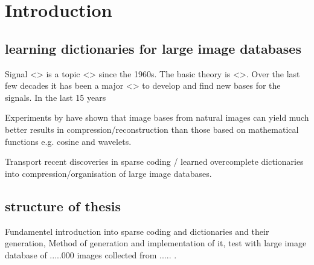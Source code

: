 \chapter{Introduction}
\label{sec:introduction}
\section{learning dictionaries for large image databases}
Signal <> is a topic <> since the 1960s. The basic theory is <>. Over the last few decades it has been
a major <> to develop and find new bases for the signals. In the last 15 years 


Experiments by \cite{} have shown \cite{} that image bases from natural images can yield much better results in compression/reconstruction than
those based on mathematical functions e.g. cosine and wavelets.


\cite{Mairal2010Online}

Transport recent discoveries in sparse coding / learned overcomplete dictionaries into compression/organisation
of large image databases.

\section{structure of thesis}
Fundamentel introduction into sparse coding and dictionaries and their generation,
Method of generation and implementation of it, test with large image database of .....000 images collected from ..... . 



